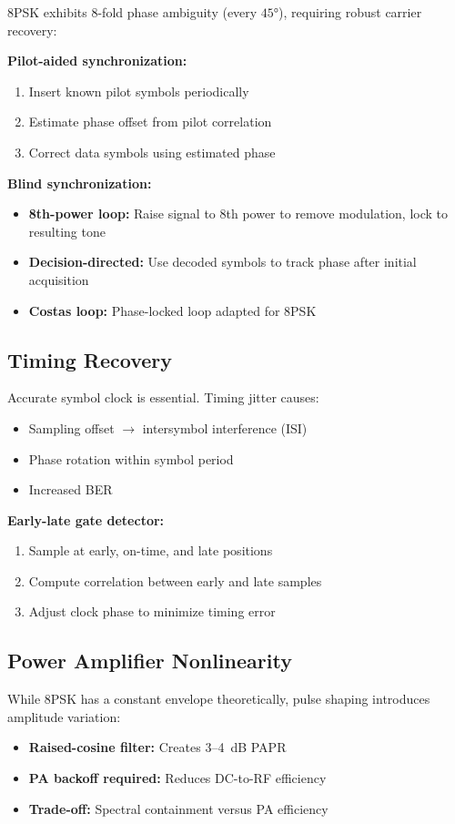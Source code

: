 8PSK exhibits 8-fold phase ambiguity (every $45°$), requiring robust carrier recovery:

\textbf{Pilot-aided synchronization:}
\begin{enumerate}
\item Insert known pilot symbols periodically
\item Estimate phase offset from pilot correlation
\item Correct data symbols using estimated phase
\end{enumerate}

\textbf{Blind synchronization:}
\begin{itemize}
\item \textbf{8th-power loop:} Raise signal to 8th power to remove modulation, lock to resulting tone
\item \textbf{Decision-directed:} Use decoded symbols to track phase after initial acquisition
\item \textbf{Costas loop:} Phase-locked loop adapted for 8PSK
\end{itemize}

\subsection{Timing Recovery}

Accurate symbol clock is essential. Timing jitter causes:
\begin{itemize}
\item Sampling offset $\rightarrow$ intersymbol interference (ISI)
\item Phase rotation within symbol period
\item Increased BER
\end{itemize}

\textbf{Early-late gate detector:}
\begin{enumerate}
\item Sample at early, on-time, and late positions
\item Compute correlation between early and late samples
\item Adjust clock phase to minimize timing error
\end{enumerate}

\subsection{Power Amplifier Nonlinearity}

While 8PSK has a constant envelope theoretically, pulse shaping introduces amplitude variation:
\begin{itemize}
\item \textbf{Raised-cosine filter:} Creates 3--4~dB PAPR
\item \textbf{PA backoff required:} Reduces DC-to-RF efficiency
\item \textbf{Trade-off:} Spectral containment versus PA efficiency
\end{itemize}


